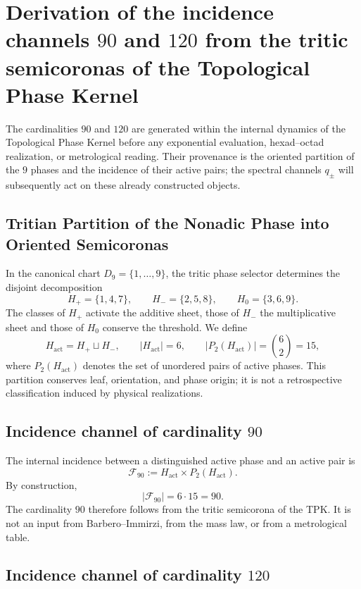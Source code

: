 \section{Derivation of the incidence channels \texorpdfstring{\(90\)}{90} and \texorpdfstring{\(120\)}{120} from the tritic semicoronas of the Topological Phase Kernel}
\label{sec:sucesor-102-incidencia-tpk-90-120}

The cardinalities \(90\) and \(120\) are generated within the internal dynamics of the Topological Phase Kernel before any exponential evaluation, hexad--octad realization, or metrological reading. Their provenance is the oriented partition of the \(9\) phases and the incidence of their active pairs; the spectral channels \(q_\pm\) will subsequently act on these already constructed objects.

\subsection{Tritian Partition of the Nonadic Phase into Oriented Semicoronas}

In the canonical chart \(D_9=\{1,\ldots,9\}\), the tritic phase selector
determines the disjoint decomposition
\[
 H_+=\{1,4,7\},\qquad
 H_-=\{2,5,8\},\qquad
 H_0=\{3,6,9\}.
\]
The classes of \(H_+\) activate the additive sheet, those of \(H_-\) the
multiplicative sheet and those of \(H_0\) conserve the threshold. We define
\[
 H_{\mathrm{act}}=H_+\sqcup H_-,
 \qquad |H_{\mathrm{act}}|=6,
 \qquad \bigl|P_2(H_{\mathrm{act}})\bigr|=\binom62=15,
\]
where \(P_2(H_{\mathrm{act}})\) denotes the set of unordered pairs of
active phases. This partition conserves leaf, orientation, and phase origin; it is not
a retrospective classification induced by physical realizations.

\subsection{Incidence channel of cardinality \texorpdfstring{\(90\)}{90}}

The internal incidence between a distinguished active phase and an active pair is
\[
 \mathcal F_{90}
 :=H_{\mathrm{act}}\times P_2(H_{\mathrm{act}}).
\]
By construction,
\[
 |\mathcal F_{90}|=6\cdot15=90.
\]
The cardinality \(90\) therefore follows from the tritic semicorona of the TPK. It is
not an input from Barbero--Immirzi, from the mass law, or from a
metrological table.

\subsection{Incidence channel of cardinality \texorpdfstring{\(120\)}{120}}

